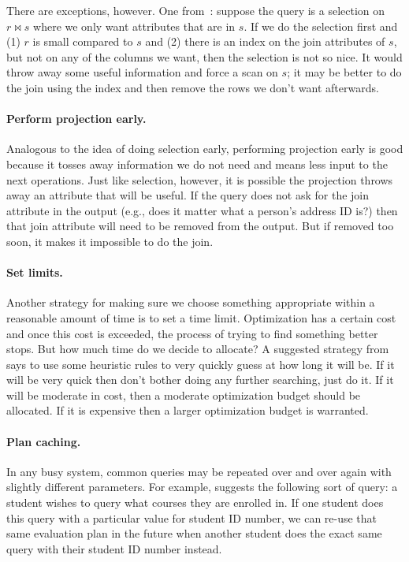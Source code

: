 There are exceptions, however. One from~\cite{dsc}: suppose the query is a selection on $r \bowtie s$ where we only want attributes that are in $s$. If we do the selection first and (1) $r$ is small compared to $s$ and (2) there is an index on the join attributes of $s$, but not on any of the columns we want, then the selection is not so nice. It would throw away some useful information and force a scan on $s$; it may be better to do the join using the index and then remove the rows we don't want afterwards.

\paragraph{Perform projection early.} Analogous to the idea of doing selection early, performing projection early is good because it tosses away information we do not need and means less input to the next operations. Just like selection, however, it is possible the projection throws away an attribute that will be useful. If the query does not ask for the join attribute in the output (e.g., does it matter what a person's address ID is?) then that join attribute will need to be removed from the output. But if removed too soon, it makes it impossible to do the join.

\paragraph{Set limits.} Another strategy for making sure we choose something appropriate within a reasonable amount of time is to set a time limit. Optimization has a certain cost and once this cost is exceeded, the process of trying to find something better stops. But how much time do we decide to allocate? A suggested strategy from~\cite{dsc} says to use some heuristic rules to very quickly guess at how long it will be. If it will be very quick then don't bother doing any further searching, just do it. If it will be moderate in cost, then a moderate optimization budget should be allocated. If it is expensive then a larger optimization budget is warranted.

\paragraph{Plan caching.} In any busy system, common queries may be repeated over and over again with slightly different parameters. For example, \cite{dsc} suggests the following sort of query: a student wishes to query what courses they are enrolled in. If one student does this query with a particular value for student ID number, we can re-use that same evaluation plan in the future when another student does the exact same query with their student ID number instead. 

